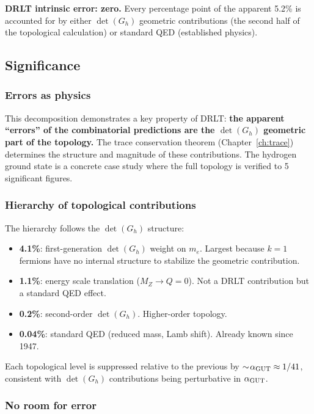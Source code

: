 \textbf{DRLT intrinsic error: zero.} Every percentage point of the apparent 5.2\% is accounted for by either $\det(G_h)$ geometric contributions (the second half of the topological calculation) or standard QED (established physics).

\subsection{Significance}

\subsubsection{Errors as physics}

This decomposition demonstrates a key property of DRLT: \textbf{the apparent ``errors'' of the combinatorial predictions are the $\det(G_h)$ geometric part of the topology.} The trace conservation theorem (Chapter~\ref{ch:trace}) determines the structure and magnitude of these contributions. The hydrogen ground state is a concrete case study where the full topology is verified to 5 significant figures.

\subsubsection{Hierarchy of topological contributions}

The hierarchy follows the $\det(G_h)$ structure:
\begin{itemize}
\item \textbf{4.1\%}: first-generation $\det(G_h)$ weight on $m_e$. Largest because $k = 1$ fermions have no internal structure to stabilize the geometric contribution.
\item \textbf{1.1\%}: energy scale translation ($M_Z \to Q = 0$). Not a DRLT contribution but a standard QED effect.
\item \textbf{0.2\%}: second-order $\det(G_h)$. Higher-order topology.
\item \textbf{0.04\%}: standard QED (reduced mass, Lamb shift). Already known since 1947.
\end{itemize}

Each topological level is suppressed relative to the previous by $\sim\!\alpha_{\mathrm{GUT}} \approx 1/41$, consistent with $\det(G_h)$ contributions being perturbative in $\alpha_{\mathrm{GUT}}$.

\subsubsection{No room for error}

